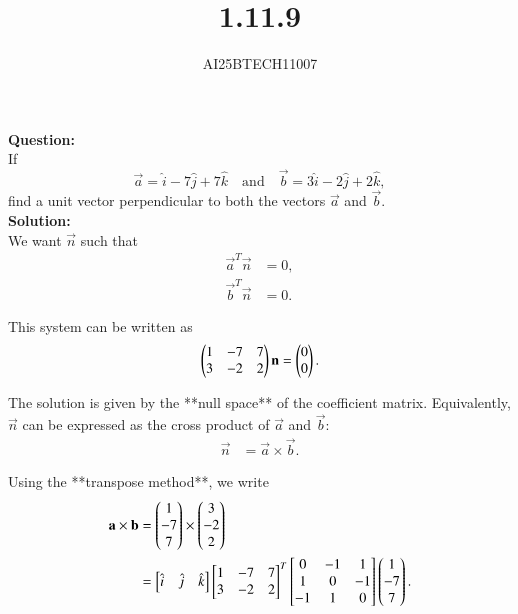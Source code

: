 \documentclass[journal]{IEEEtran}
\begin{document}

\vspace{3cm}

\title{1.11.9}
\author{AI25BTECH11007}
 \maketitle
{\let\newpage\relax\maketitle}

\renewcommand{\thefigure}{\theenumi}
\renewcommand{\thetable}{\theenumi}
\setlength{\intextsep}{10pt} %


\renewcommand{\thetable}{\theenumi}
\noindent
\textbf{Question:}\\
If
\[
\vec{a} = \hat{i} - 7\hat{j} + 7\hat{k}
\quad \text{and} \quad
\vec{b} = 3\hat{i} - 2\hat{j} + 2\hat{k},
\]
find a unit vector perpendicular to both the vectors $\vec{a}$ and $\vec{b}$.\\
\textbf{Solution:}\\
We want $\vec{n}$ such that 
\begin{align}
\vec{a}^T \vec{n} &= 0, \label{eq:orth1} \\
\vec{b}^T \vec{n} &= 0. \label{eq:orth2}
\end{align}

This system can be written as
\begin{align}
\begin{pmatrix}
1 & -7 & 7 \\
3 & -2 & 2
\end{pmatrix}
\mathbf{n} = \begin{pmatrix}0 \\ 0\end{pmatrix}.
\end{align}

The solution is given by the **null space** of the coefficient matrix.  
Equivalently, $\vec{n}$ can be expressed as the cross product of $\vec{a}$ and $\vec{b}$:
\begin{align}
\vec{n} &= \vec{a} \times \vec{b}. \label{eq:axb}
\end{align}

Using the **transpose method**, we write
\begin{align}
\mathbf{a} \times \mathbf{b} &= 
\begin{pmatrix}1 \\ -7 \\ 7\end{pmatrix} \times \begin{pmatrix}3 \\ -2 \\ 2\end{pmatrix} \\
&= 
\begin{bmatrix}
\hat{i} & \hat{j} & \hat{k}
\end{bmatrix}
\begin{bmatrix}
1 & -7 & 7 \\
3 & -2 & 2
\end{bmatrix}^T
\begin{bmatrix}
0 & -1 & 1 \\
1 & 0 & -1 \\
-1 & 1 & 0
\end{bmatrix}
\begin{pmatrix}1 \\ -7 \\ 7\end{pmatrix}. \label{eq:transpose}
\end{align}
\end{document}
